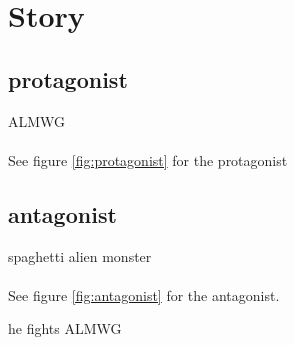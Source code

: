 \chapter{Story}
\section{protagonist}
\ac{ALMWG}\\
\\
See figure \ref{fig:protagonist} for the protagonist
\newpage
\section{antagonist}
spaghetti alien monster\\
\\
See figure \ref{fig:antagonist} for the antagonist.

he fights \ac{ALMWG}